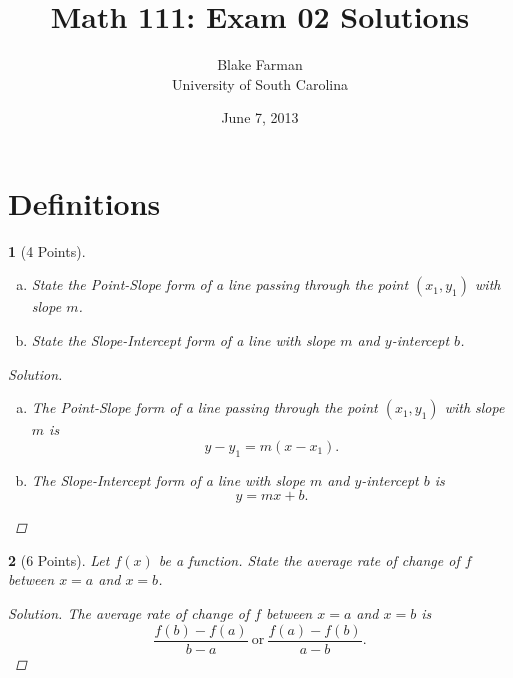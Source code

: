 \documentclass[12pt]{amsart}
\author{Blake Farman\\University of South Carolina}
\title{Math 111: Exam 02 Solutions}
\date{June 7, 2013}
\begin{document}
\maketitle

\begin{center}
\end{center}

\vspace{0.2in}
\vspace{0.2in}

\theoremstyle{plain}
\newtheorem{thm}{}
\newtheorem{lem}{Lemma}
\theoremstyle{definition}
\newtheorem{defn}{Definition}

\section{Definitions}
\begin{thm}[4 Points]\label{ex1}
  \begin{enumerate}[(a)]
  \item
    State the Point-Slope form of a line passing through the point $(x_1, y_1)$ with slope $m$.
  \item
    State the Slope-Intercept form of a line with slope $m$ and $y$-intercept $b$.
  \end{enumerate}
  
  \begin{proof}[Solution]
    \begin{enumerate}[(a)]
    \item
      The Point-Slope form of a line passing through the point $(x_1, y_1)$ with slope $m$ is
      $$y - y_1 = m(x - x_1).$$
    \item
      The Slope-Intercept form of a line with slope $m$ and $y$-intercept $b$ is
      $$y = mx + b.$$
    \end{enumerate}
  \end{proof}
\end{thm}

\begin{thm}[6 Points]\label{ex2}
  Let $f(x)$ be a function.
  State the average rate of change of $f$ between $x = a$ and $x = b$.
  
  \begin{proof}[Solution]
    The average rate of change of $f$ between $x = a$ and $x = b$ is
    $$\frac{f(b) - f(a)}{b - a}\ \text{or}\ \frac{f(a) - f(b)}{a - b}.$$
  \end{proof}
\end{thm}
\end{document}
